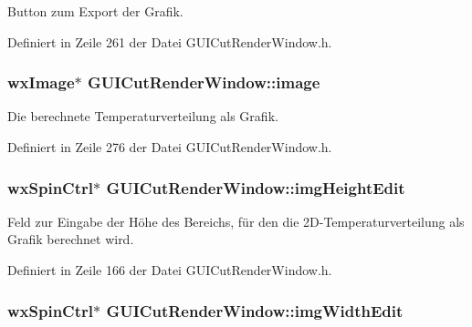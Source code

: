 Button zum Export der Grafik. 



Definiert in Zeile 261 der Datei G\-U\-I\-Cut\-Render\-Window.\-h.

\hypertarget{classGUICutRenderWindow_a30c36db74a83fc5523407d3611c1db34}{
\subsubsection[{image}]{\setlength{\rightskip}{0pt plus 5cm}wx\-Image$\ast$ G\-U\-I\-Cut\-Render\-Window\-::image\hspace{0.3cm}{\ttfamily [private]}}}\label{classGUICutRenderWindow_a30c36db74a83fc5523407d3611c1db34}


Die berechnete Temperaturverteilung als Grafik. 



Definiert in Zeile 276 der Datei G\-U\-I\-Cut\-Render\-Window.\-h.

\hypertarget{classGUICutRenderWindow_a4daa569840f00756e6781ad2d87aef5b}{
\subsubsection[{img\-Height\-Edit}]{\setlength{\rightskip}{0pt plus 5cm}wx\-Spin\-Ctrl$\ast$ G\-U\-I\-Cut\-Render\-Window\-::img\-Height\-Edit\hspace{0.3cm}{\ttfamily [private]}}}\label{classGUICutRenderWindow_a4daa569840f00756e6781ad2d87aef5b}


Feld zur Eingabe der Höhe des Bereichs, für den die 2\-D-\/\-Temperaturverteilung als Grafik berechnet wird. 



Definiert in Zeile 166 der Datei G\-U\-I\-Cut\-Render\-Window.\-h.

\hypertarget{classGUICutRenderWindow_a211043ba4bd60862a9fbfe1186c40875}{
\subsubsection[{img\-Width\-Edit}]{\setlength{\rightskip}{0pt plus 5cm}wx\-Spin\-Ctrl$\ast$ G\-U\-I\-Cut\-Render\-Window\-::img\-Width\-Edit\hspace{0.3cm}{\ttfamily [private]}}}\label{classGUICutRenderWindow_a211043ba4bd60862a9fbfe1186c40875}


